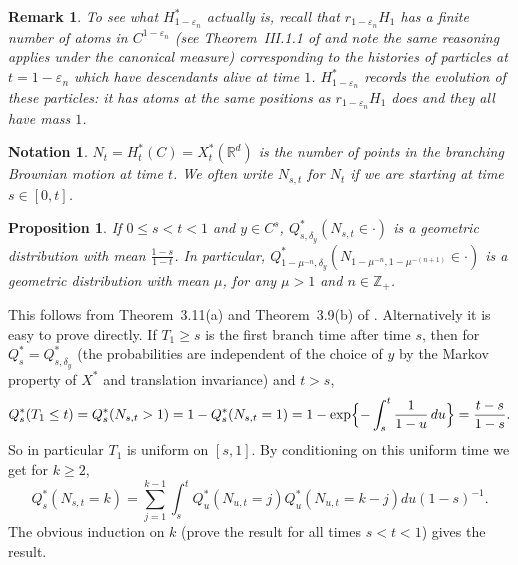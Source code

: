 \documentclass[12pt]{article}
\makeatletter
\renewenvironment{proof}[1][\proofname]{%
\par\pushQED{\qed}\normalfont%
\topsep6\p@\@plus6\p@\relax
\trivlist\item[\hskip\labelsep\bfseries#1\@addpunct{.}]%
\ignorespaces
}{%
\popQED\endtrivlist\@endpefalse
}
\newtheorem{proposition}[theorem]{Proposition}
\numberwithin{theorem}{section}
\newtheorem{remark}[theorem]{Remark}
\theoremstyle{def}
\newtheorem*{notation}{Notation}
\numberwithin{equation}{section}
\newcommand{\R}{\mathbb{R}}
\newcommand{\Z}{\mathbb{Z}}
\newcommand{\veps}{\varepsilon}
\makeatother
\begin{document}
\begin{remark}\label{H*defn}
To see what $H^*_{1-\veps_n}$ actually is, recall that  $r_{1-\veps_n}H_1$ has a finite number of atoms in $C^{1-\veps_n}$ (see Theorem~III.1.1 of \cite{Per02} and note the same reasoning applies under the canonical measure) corresponding to the histories of particles at $t=1-{\veps_n}$ which have descendants alive at time $1$. 
$H^*_{1-\veps_n}$ records the evolution of these particles: it has atoms at the same positions as $r_{1-\veps_n}H_1$ does and they all have mass $1$.
\end{remark}

\begin{notation}  $N_t=H^*_t(C)=X^*_t(\R^d)$ is the number of points in the branching Brownian motion at time $t$.  We often write $N_{s,t}$ for $N_t$ if we are starting at time $s\in[0,t]$.  
\end{notation}

\begin{proposition}\label{geometricZ} If $0\le s<t <1$ and $y\in C^s$, $Q^*_{s,\delta_y}(N_{s,t}\in\cdot)$ is a geometric distribution with mean $\frac{1-s}{1-t}$. In particular, $Q^*_{1-\mu^{-n},\delta_y}(N_{1-\mu^{-n},1-\mu^{-(n+1)}}\in\cdot)$ is a geometric distribution with mean $\mu$, for any $\mu>1$ and $n\in\Z_+$. 
\end{proposition}
\begin{proof} This follows from Theorem~3.11(a) and Theorem~3.9(b) of \cite{DP91}. Alternatively it is easy to prove  directly. If $T_1\ge s$ is the first branch time after time $s$, then for $Q_s^*=Q^*_{s,\delta_y}$ (the probabilities are independent of the choice of $y$ by the Markov property of $X^*$ and translation invariance) and $t>s$,
\[Q_s^*(T_1\le t)=Q_s^*(N_{s,t}>1)=1-Q_s^*(N_{s,t}=1)=1-\exp\Bigl\{-\int_s^t\frac{1}{1-u}\,du\Bigr\}=\frac{t-s}{1-s}.\]
So in particular $T_1$ is uniform on $[s,1]$. By conditioning on this uniform time we get for $k\ge 2$,
\[Q_s^*(N_{s,t}=k)=\sum_{j=1}^{k-1}\int_s^t Q_u^{*}(N_{u,t}=j)Q_u^{*}(N_{u,t}=k-j)du(1-s)^{-1}.\]
The obvious induction on $k$ (prove the result for all  times $s<t<1$) gives the result. 
\end{proof}
\end{document}
